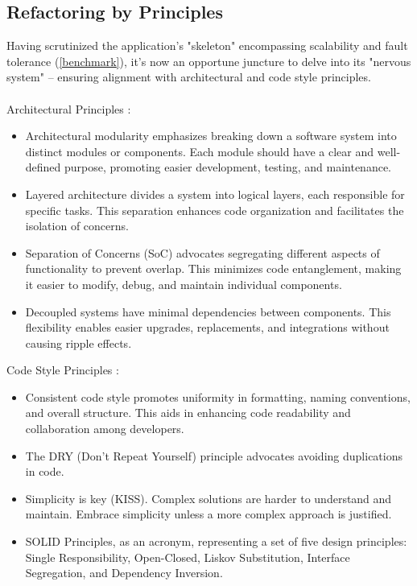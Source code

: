
\subsection{Refactoring by Principles}

Having scrutinized the application's "skeleton" encompassing scalability and fault tolerance (\ref{benchmark}), it's 
now an opportune juncture to delve into its "nervous system" -- ensuring alignment with architectural and code style 
principles.\\
\\

\noindent Architectural Principles \cite{Mart18}:

\begin{itemize}
  \item Architectural modularity emphasizes breaking down a software system into distinct modules or 
  components. Each module should have a clear and well-defined purpose, promoting easier development, testing, and 
  maintenance.

  \item Layered architecture divides a system into logical layers, each responsible for specific tasks. This 
  separation enhances code organization and facilitates the isolation of concerns.

  \item Separation of Concerns (SoC) advocates segregating different aspects of functionality to prevent overlap. 
  This minimizes code entanglement, making it easier to modify, debug, and maintain individual components.

  \item Decoupled systems have minimal dependencies between components. This flexibility enables easier 
  upgrades, replacements, and integrations without causing ripple effects.
\end{itemize}

\noindent Code Style Principles \cite{Mart22}:

\begin{itemize}
  \item Consistent code style promotes uniformity in formatting, naming conventions, and overall structure. 
  This aids in enhancing code readability and collaboration among developers.

  \item The DRY (Don't Repeat Yourself) principle advocates avoiding duplications in code.

  \item Simplicity is key (KISS). Complex solutions are harder to understand and maintain. Embrace simplicity unless a 
  more complex approach is justified.

  \item SOLID Principles, as an acronym, representing a set of five design principles: Single Responsibility, 
  Open-Closed, Liskov Substitution, Interface Segregation, and Dependency Inversion.
\end{itemize}

